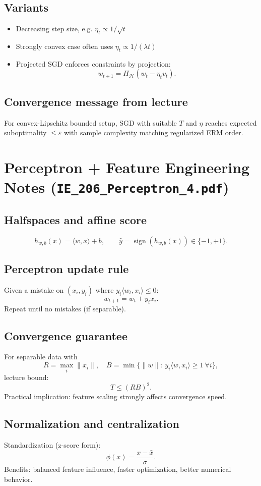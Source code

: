 \documentclass[11pt]{article}
\newcommand{\1}{\mathbf{1}}
\begin{document}
\subsection*{Variants}
\begin{itemize}
\item Decreasing step size, e.g. $\eta_t\propto 1/\sqrt t$
\item Strongly convex case often uses $\eta_t\propto 1/(\lambda t)$
\item Projected SGD enforces constraints by projection:
\[
w_{t+1}=\Pi_{\mathcal H}(w_t-\eta_t v_t).
\]
\end{itemize}

\subsection*{Convergence message from lecture}
For convex-Lipschitz bounded setup, SGD with suitable $T$ and $\eta$ reaches expected suboptimality $\le\varepsilon$ with sample complexity matching regularized ERM order.

\section{Perceptron + Feature Engineering Notes (\texttt{IE\_206\_Perceptron\_4.pdf})}
\subsection*{Halfspaces and affine score}
\[
h_{w,b}(x)=\langle w,x\rangle+b,
\qquad
\hat y=\operatorname{sign}(h_{w,b}(x))\in\{-1,+1\}.
\]

\subsection*{Perceptron update rule}
Given a mistake on $(x_i,y_i)$ where $y_i\langle w_t,x_i\rangle\le0$:
\[
w_{t+1}=w_t+y_ix_i.
\]
Repeat until no mistakes (if separable).

\subsection*{Convergence guarantee}
For separable data with
\[
R=\max_i\|x_i\|,
\quad
B=\min\{\|w\|:\ y_i\langle w,x_i\rangle\ge1\ \forall i\},
\]
lecture bound:
\[
T\le(RB)^2.
\]
Practical implication: feature scaling strongly affects convergence speed.

\subsection*{Normalization and centralization}
Standardization (z-score form):
\[
\phi(x)=\frac{x-\bar x}{\sigma}.
\]
Benefits: balanced feature influence, faster optimization, better numerical behavior.
\end{document}
